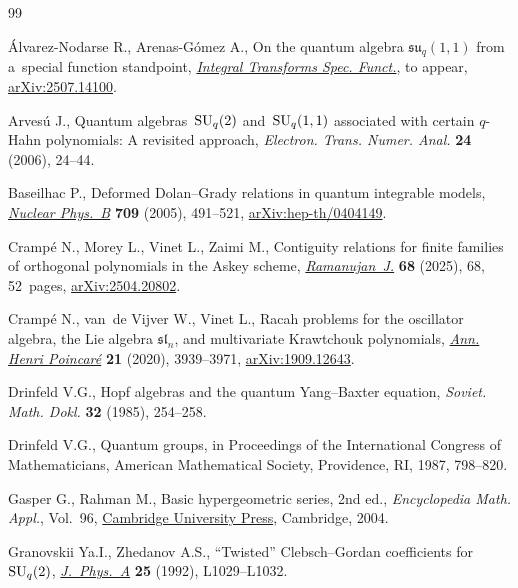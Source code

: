 \documentclass[10pt,a4paper]{amsart}
\numberwithin{equation}{section}
\theoremstyle{definition}
\begin{document}
\begin{thebibliography}{99}
\footnotesize\itemsep=0pt

{\'A}lvarez-Nodarse R., Arenas-G\'omez A., On the quantum algebra
 $\mathfrak{su}_q(1,1)$ from a~special function standpoint,
 \href{https://doi.org/10.1080/10652469.2025.2579756}{\textit{Integral
 Transforms Spec. Funct.}}, {t}o appear,
 \href{http://arxiv.org/abs/2507.14100}{arXiv:2507.14100}.

Arves\'u J., Quantum algebras~{${\rm SU}_q(2)$} and~{${\rm SU}_q(1,1)$}
 associated with certain {$q$}-{H}ahn polynomials: {A} revisited approach,
 \textit{Electron. Trans. Numer. Anal.} \textbf{24} (2006), 24--44.

Baseilhac P., Deformed {D}olan--{G}rady relations in quantum integrable models,
 \href{https://doi.org/10.1016/j.nuclphysb.2004.12.016}{\textit{Nuclear
 Phys.~B}} \textbf{709} (2005), 491--521,
 \href{http://arxiv.org/abs/hep-th/0404149}{arXiv:hep-th/0404149}.

Cramp\'e N., Morey L., Vinet L., Zaimi M., Contiguity relations for finite
 families of orthogonal polynomials in the {A}skey scheme,
 \href{https://doi.org/10.1007/s11139-025-01229-w}{\textit{Ramanujan~J.}}
 \textbf{68} (2025), 68, 52~pages,
 \href{http://arxiv.org/abs/2504.20802}{arXiv:2504.20802}.

Cramp\'e N., van~de Vijver W., Vinet L., Racah problems for the oscillator
 algebra, the {L}ie algebra {$\mathfrak{sl}_n$}, and multivariate {K}rawtchouk
 polynomials, \href{https://doi.org/10.1007/s00023-020-00972-8}{\textit{Ann.
 Henri Poincar\'e}} \textbf{21} (2020), 3939--3971,
 \href{http://arxiv.org/abs/1909.12643}{arXiv:1909.12643}.

Drinfeld V.G., Hopf algebras and the quantum {Y}ang--{B}axter equation,
 \textit{Soviet. Math. Dokl.} \textbf{32} (1985), 254--258.

Drinfeld V.G., Quantum groups, in Proceedings of the {I}nternational {C}ongress
 of {M}athematicians, American Mathematical Society, Providence, RI, 1987,
 798--820.

Gasper G., Rahman M., Basic hypergeometric series, 2nd ed., \textit{Encyclopedia Math.
 Appl.}, Vol.~96,
 \href{https://doi.org/10.1017/CBO9780511526251}{Cambridge University Press},
 Cambridge, 2004.

Granovskii Ya.I., Zhedanov A.S., ``{T}wisted'' {C}lebsch--{G}ordan coefficients
 for~{${\rm SU}_q(2)$},
 \href{https://doi.org/10.1088/0305-4470/25/17/002}{\textit{J.~Phys.~A}}
 \textbf{25} (1992), L1029--L1032.


\end{thebibliography}
\end{document}
